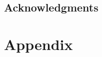 \documentclass[12pt]{article}
\begin{document}
\subsection*{Acknowledgments}

\printbibliography

\clearpage

\section{Appendix}


\end{document}
